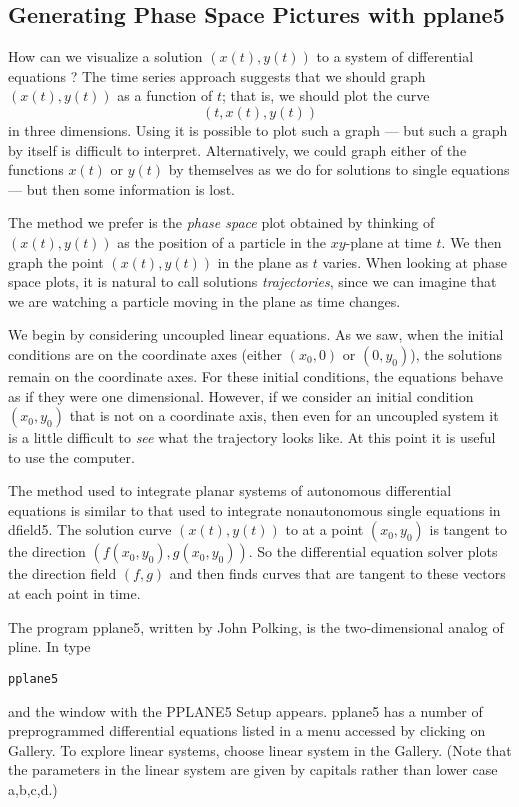 \subsection*{Generating Phase Space Pictures with {\sf pplane5}}

How can we visualize a solution $(x(t),y(t))$ to a system of
differential equations ?  The time series approach
suggests that we should graph $(x(t),y(t))$ as a function of $t$;
that is, we should plot the curve
\[
(t,x(t),y(t))
\]
in three dimensions.  Using \Matlab it is
possible to plot such a graph --- but such a graph by itself is
difficult to interpret.  Alternatively, we could graph either of
the functions $x(t)$ or $y(t)$ by themselves as we do for
solutions to single equations --- but then some information is
lost.

The method we prefer is the {\em phase space\/} 
plot obtained by thinking of $(x(t),y(t))$ as the
position of a particle in the $xy$-plane at time $t$.  We then
graph the point $(x(t),y(t))$ in the plane as $t$ varies.  When
looking at phase space plots, it is natural to call solutions
{\em trajectories\/}, since we can imagine
that we are watching a particle moving in the plane as time
changes.

We begin by considering uncoupled linear equations.  As we saw,
when the initial conditions are on the coordinate axes (either
$(x_0,0)$ or $(0,y_0)$), the solutions remain on the coordinate
axes.  For these initial conditions, the equations behave as if
they were one dimensional.  However, if we consider an initial
condition $(x_0,y_0)$ that is not on a coordinate axis, then even
for an uncoupled system it is a little difficult to
{\em see\/} what the trajectory looks like.  At this point
it is useful to use the computer.

The method used to integrate planar systems of autonomous
differential equations is similar to that used to integrate
nonautonomous single equations in {\sf dfield5}.  The solution
curve $(x(t),y(t))$ to  at a point $(x_0,y_0)$ is
tangent to the direction $(f(x_0,y_0),g(x_0,y_0))$.  So
the differential equation solver plots the direction field
$(f,g)$ and then finds curves that are tangent to these
vectors at each point in time.

The program {\sf pplane5}, written by John
Polking, is the two-dimensional analog of {\sf pline}.  
In \Matlab type
\begin{verbatim}
pplane5
\end{verbatim}
and the window with the {\sf PPLANE5 Setup} appears. {\sf pplane5}
has a number of preprogrammed differential equations listed in a
menu accessed by clicking on {\sf Gallery}.  To explore linear
systems, choose {\sf linear system} in the {\sf Gallery}.  (Note that the 
parameters in the {\sf linear system} are given by capitals rather than 
lower case {\sf a,b,c,d}.)

